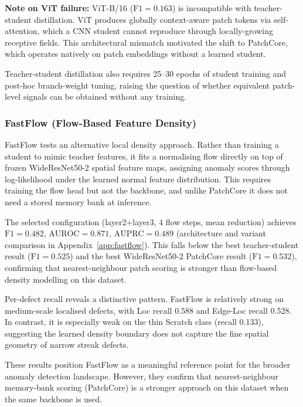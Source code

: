 \documentclass[11pt]{article}
\begin{document}
\textbf{Note on ViT failure:} ViT-B/16 ($\mathrm{F1}=0.163$) is incompatible with teacher-student distillation.
ViT produces globally context-aware patch tokens via self-attention, which a CNN student cannot reproduce
through locally-growing receptive fields. This architectural mismatch motivated the shift to PatchCore,
which operates natively on patch embeddings without a learned student.

Teacher-student distillation also requires 25--30 epochs of student training and post-hoc branch-weight tuning,
raising the question of whether equivalent patch-level signals can be obtained without any training.

\subsubsection{FastFlow (Flow-Based Feature Density)}

FastFlow tests an alternative local density approach. Rather than training a
student to mimic teacher features, it fits a normalising flow directly on top
of frozen WideResNet50-2 spatial feature maps, assigning anomaly scores through
log-likelihood under the learned normal feature distribution. This requires
training the flow head but not the backbone, and unlike PatchCore it does not
need a stored memory bank at inference.

The selected configuration (layer2+layer3, 4 flow steps, mean reduction) achieves $\mathrm{F1}=0.482$, $\mathrm{AUROC}=0.871$, $\mathrm{AUPRC}=0.489$ (architecture and variant comparison in Appendix~\ref{app:fastflow}). This falls below the best teacher-student result ($\mathrm{F1}=0.525$) and the best WideResNet50-2 PatchCore result ($\mathrm{F1}=0.532$), confirming that nearest-neighbour patch scoring is stronger than flow-based density modelling on this dataset.

Per-defect recall reveals a distinctive pattern. FastFlow is relatively strong
on medium-scale localised defects, with Loc recall 0.588 and Edge-Loc recall 0.528.
In contrast, it is especially weak on the thin Scratch class (recall 0.133),
suggesting the learned density boundary does not capture the fine spatial geometry
of narrow streak defects.

These results position FastFlow as a meaningful reference point for the broader
anomaly detection landscape. However, they confirm that nearest-neighbour memory-bank
scoring (PatchCore) is a stronger approach on this dataset when the same backbone is used.
\end{document}
